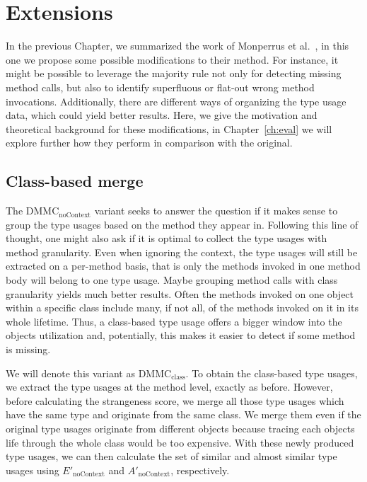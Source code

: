 \chapter{Extensions}\label{ch:ext}

In the previous Chapter, we summarized the work of Monperrus et al.~\cite{monperrus2010detecting}\cite{monperrus2013detecting}, in this one we propose some possible modifications to their method.
For instance, it might be possible to leverage the majority rule not only for detecting missing method calls, but also to identify superfluous or flat-out wrong method invocations.
Additionally, there are different ways of organizing the type usage data, which could yield better results.
Here, we give the motivation and theoretical background for these modifications, in Chapter~\ref{ch:eval} we will explore further how they perform in comparison with the original.

\section{Class-based merge}

The $\text{DMMC}_{\text{noContext}}$ variant seeks to answer the question if it makes sense to group the type usages based on the method they appear in.
Following this line of thought, one might also ask if it is optimal to collect the type usages with method granularity.
Even when ignoring the context, the type usages will still be extracted on a per-method basis, that is only the methods invoked in one method body will belong to one type usage.
Maybe grouping method calls with class granularity yields much better results.
Often the methods invoked on one object within a specific class include many, if not all, of the methods invoked on it in its whole lifetime.
Thus, a class-based type usage offers a bigger window into the objects utilization and, potentially, this makes it easier to detect if some method is missing.

We will denote this variant as $\text{DMMC}_{\text{class}}$.
To obtain the class-based type usages, we extract the type usages at the method level, exactly as before.
However, before calculating the strangeness score, we merge all those type usages which have the same type and originate from the same class.
We merge them even if the original type usages originate from different objects because tracing each objects life through the whole class would be too expensive.
With these newly produced type usages, we can then calculate the set of similar and almost similar type usages using $E'_{\text{noContext}}$ and $A'_{\text{noContext}}$, respectively.

